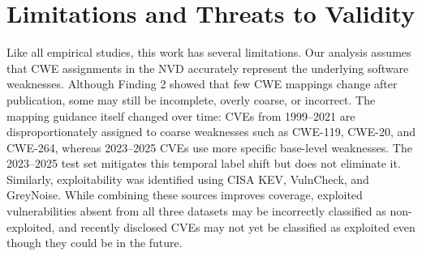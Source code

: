 \documentclass[conference,compsoc]{IEEEtran}
\begin{document}



\section{Limitations and Threats to Validity}

Like all empirical studies, this work has several limitations. Our analysis assumes that CWE assignments in the NVD accurately represent the underlying software weaknesses. Although Finding 2 showed that few CWE mappings change after publication, some may still be incomplete, overly coarse, or incorrect. The mapping guidance itself changed over time: CVEs from 1999--2021 are disproportionately assigned to coarse weaknesses such as CWE-119, CWE-20, and CWE-264, whereas 2023--2025 CVEs use more specific base-level weaknesses. The 2023--2025 test set mitigates this temporal label shift but does not eliminate it. Similarly, exploitability was identified using CISA KEV, VulnCheck, and GreyNoise. While combining these sources improves coverage, exploited vulnerabilities absent from all three datasets may be incorrectly classified as non-exploited, and recently disclosed CVEs may not yet be classified as exploited even though they could be in the future.
\end{document}
